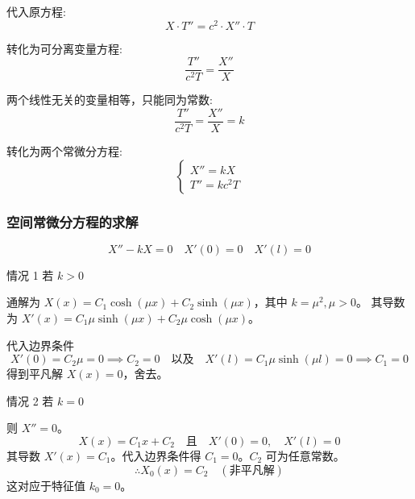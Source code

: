 \documentclass[12pt,a4paper]{article}
\numberwithin{subsection}{section}   %
\numberwithin{subsubsection}{subsection}
\theoremstyle{plain}
\theoremstyle{definition}
\theoremstyle{remark}
\theoremstyle{remark}
\begin{document}
	代入原方程:
	\begin{equation} \label{eq:original_substitution_neumann}
		X \cdot T'' = c^2 \cdot X'' \cdot T
	\end{equation}
	
	转化为可分离变量方程:
	\begin{equation} \label{eq:separation_neumann}
		\frac{T''}{c^2 T} = \frac{X''}{X}
	\end{equation}
	
	两个线性无关的变量相等，只能同为常数:
	\begin{equation} \label{eq:constant_neumann}
		\frac{T''}{c^2 T} = \frac{X''}{X} = k
	\end{equation}
	
	转化为两个常微分方程:
	\begin{equation} \label{eq:ode_neumann}
		\begin{cases}
			X'' = kX \\
			T'' = k c^2 T
		\end{cases}
	\end{equation}
	
	\subsubsection{空间常微分方程的求解}
	\begin{equation}
		X'' - kX = 0 \quad X'(0) = 0 \quad X'(l) = 0
	\end{equation}
	
	情况 1 \quad 若 \(k > 0\)
	
	通解为 \(X(x) = C_1 \cosh(\mu x) + C_2 \sinh(\mu x)\)，其中 \(k = \mu^2, \mu>0\)。
	其导数为 $X'(x) = C_1 \mu \sinh(\mu x) + C_2 \mu \cosh(\mu x)$。
	
	代入边界条件
	\begin{equation}
		X'(0) = C_2 \mu = 0 \implies C_2 = 0 \quad \text{以及} \quad X'(l) = C_1 \mu \sinh(\mu l) = 0 \implies C_1 = 0
	\end{equation}
	得到平凡解 $X(x)=0$，舍去。
	
	情况 2 \quad 若 \(k = 0\)
	
	则 \(X'' = 0\)。
	\begin{equation}
		X(x) = C_1 x + C_2 \quad \text{且} \quad X'(0) = 0, \quad X'(l) = 0
	\end{equation}
	其导数 $X'(x) = C_1$。代入边界条件得 $C_1=0$。$C_2$ 可为任意常数。
	\begin{equation}
		\therefore X_0(x) = C_2 \quad (\text{非平凡解})
	\end{equation}
	这对应于特征值 $k_0=0$。
	
\end{document}
